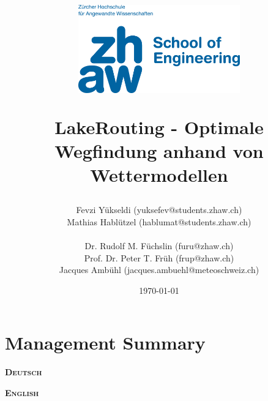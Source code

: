 \documentclass[a4paper,10pt]{article}
\begin{document}
 

\pagestyle{fancy} %
\fancyhf{} %
\renewcommand{\headrulewidth}{0.4pt} 
\fancyfoot[C]{\thepage}

\title{
 \begin{flushleft}
  \vspace*{-3cm}
  \includegraphics[keepaspectratio,width=7cm]{img/de-zhaw-cmyk}
 \end{flushleft}
 \vspace*{4cm}
 LakeRouting - Optimale Wegfindung anhand von Wettermodellen
}

\date{\today}
\author{Fevzi Yükseldi (yuksefev@students.zhaw.ch)\\
 Mathias Hablützel (hablumat@students.zhaw.ch)\\
 \\
 Dr. Rudolf M. Füchslin (furu@zhaw.ch)\\
 Prof. Dr. Peter T. Früh (frup@zhaw.ch)\\
 Jacques Ambühl (jacques.ambuehl@meteoschweiz.ch)
}
 
\maketitle

\thispagestyle{empty}
\newpage
\thispagestyle{empty}

\part*{Management Summary}

\vspace*{2cm}
\setlength{\columnsep}{2cm}
\begin{multicols}{2}

\textbf{\textsc{Deutsch}}
\vspace{1cm}\\

\columnbreak

\textbf{\textsc{English}}
\vspace{1cm}\\

\end{multicols}
\newpage
\end{document}

